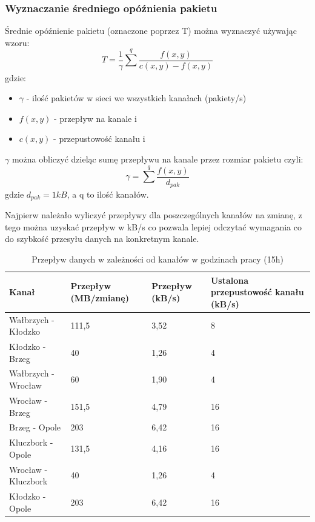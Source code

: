 \documentclass[a4paper]{article}
\begin{document}
\subsubsection{Wyznaczanie średniego opóźnienia pakietu}

Średnie opóźnienie pakietu (oznaczone poprzez T) można wyznaczyć używając wzoru:
$$ T = \frac{1}{\gamma} \sum_{}^{q} \frac{f(x,y)}{c(x,y) - f(x,y)} $$
gdzie:
\begin{itemize}
\item \(\gamma \) - ilość pakietów w sieci we wszystkich kanałach (pakiety/s)
\item \(f(x,y) \) - przepływ na kanale i
\item \(c(x,y) \) - przepustowość kanału i
\end{itemize}

\(\gamma \) można obliczyć dzieląc sumę przepływu na kanale przez rozmiar pakietu czyli:
$$ \gamma = \sum_{}^{q} \frac{f(x,y)}{d_{pak}} $$
gdzie \(d_{pak} = 1 kB \), a q to ilość kanałów.

Najpierw należało wyliczyć przepływy dla poszczególnych kanałów na zmianę, z tego można uzyskać przepływ w kB/s co pozwala lepiej odczytać wymagania co do szybkość przesyłu danych na konkretnym kanale.

\begin{table}[H]
	\centering
	\caption{Przepływ danych w zależności od kanałów w godzinach pracy (15h)}
	\begin{tabular}{llll}
		\hline
		Kanał & Przepływ (MB/zmianę) & Przepływ (kB/s) & Ustalona przepustowość kanału (kB/s) \\
        \hline
Wałbrzych - Kłodzko&111,5&3,52&8\\
Kłodzko - Brzeg&40&1,26&4\\
Wałbrzych - Wrocław&60&1,90&4\\
Wrocław - Brzeg&151,5&4,79&16\\
Brzeg - Opole&203&6,42&16\\
Kluczbork - Opole&131,5&4,16&16\\
Wrocław - Kluczbork&40&1,26&4\\
Kłodzko - Opole&203&6,42&16\\

        \hline
	\end{tabular}	
\end{table}
\end{document}
